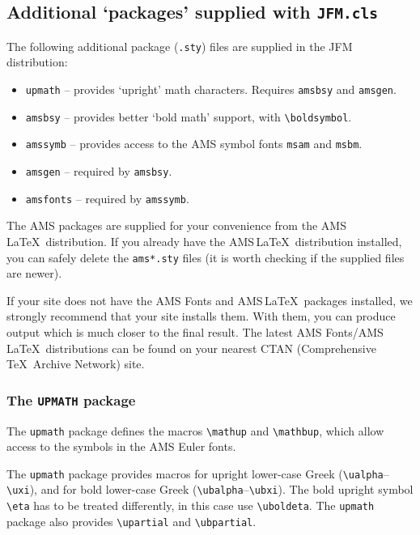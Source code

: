 \documentclass{jfm}
\providecommand\mathup[1]{##1}%
\providecommand\mathbup[1]{##1}%
\providecommand\upartial{\partial}%
\providecommand\mathup[1]{#1}%
\providecommand\mathbup[1]{#1}%
\providecommand\upartial{\partial}%
\providecommand\AMSLaTeX{AMS\,\LaTeX}
\begin{document}
\subsection{Additional `packages' supplied with \texttt{JFM.cls}}

The following additional package (\verb".sty") files are supplied in the
JFM distribution:
\begin{itemize}
  \item \verb"upmath" -- provides `upright' math characters.
        Requires \verb"amsbsy" and \verb"amsgen".

  \item \verb"amsbsy" -- provides better `bold math' support,
        with \verb"\boldsymbol".

  \item \verb"amssymb" -- provides access to the AMS symbol
        fonts \verb"msam" and \verb"msbm".

  \item \verb"amsgen" -- required by \verb"amsbsy".
  \item \verb"amsfonts" -- required by \verb"amssymb".
\end{itemize}
The AMS packages are supplied for your convenience from the
\AMSLaTeX\ distribution. If you already have the
\AMSLaTeX\ distribution installed, you can safely delete
the \verb"ams*.sty" files (it is worth checking if the supplied files
are newer).

If your site does not have the AMS Fonts and \AMSLaTeX\ packages
installed, we strongly recommend that your site installs them. With them, you
can produce output which is much closer to the final result. The latest
AMS Fonts/\AMSLaTeX\ distributions can be found
on your nearest CTAN (Comprehensive \TeX\ Archive Network) site.

\subsubsection{The \texttt{UPMATH} package}

The \verb"upmath" package defines the macros \verb"\mathup" and
\verb"\mathbup", which allow access to the symbols in the AMS Euler fonts.

The \verb"upmath" package provides macros for upright lower-case Greek
(\verb"\ualpha"--\verb"\uxi"), and for bold lower-case Greek
(\verb"\ubalpha"--\verb"\ubxi"). The bold upright symbol \verb"\eta" has to
be treated differently, in this case use \verb"\uboldeta".
The \verb"upmath" package also provides \verb"\upartial" and \verb"\ubpartial".
\end{document}
